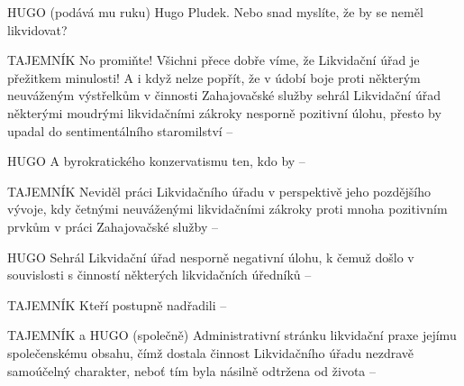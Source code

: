 \documentclass[11pt]{article}
\begin{document}
HUGO (podává mu ruku) Hugo Pludek. Nebo snad myslíte, že by se neměl likvidovat?

TAJEMNÍK No promiňte! Všichni přece dobře víme, že Likvidační úřad je přežitkem minulosti! A i když nelze popřít, že v údobí boje proti některým neuváženým výstřelkům v činnosti Zahajovačské služby sehrál Likvidační úřad některými moudrými likvidačními zákroky nesporně pozitivní úlohu, přesto by upadal do sentimentálního staromilství –

HUGO A byrokratického konzervatismu ten, kdo by –

TAJEMNÍK Neviděl práci Likvidačního úřadu v perspektivě jeho pozdějšího vývoje, kdy četnými neuváženými likvidačními zákroky proti mnoha pozitivním prvkům v práci Zahajovačské služby –

HUGO Sehrál Likvidační úřad nesporně negativní úlohu, k čemuž došlo v souvislosti s činností některých likvidačních úředníků –

TAJEMNÍK Kteří postupně nadřadili –

TAJEMNÍK a HUGO (společně) Administrativní stránku likvidační praxe jejímu společenskému obsahu, čímž dostala činnost Likvidačního úřadu nezdravě samoúčelný charakter, neboť tím byla násilně odtržena od života –
\end{document}
